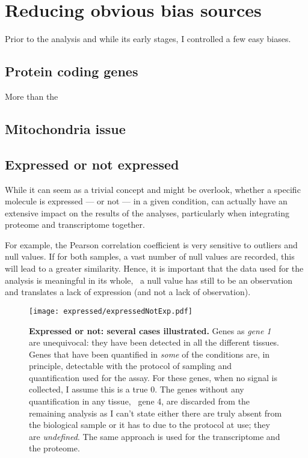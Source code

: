\section{Reducing obvious bias sources}

Prior to the analysis and while its early stages,
I controlled a few easy biases.

\subsection{Protein coding genes}
More than the 

\subsection{Mitochondria issue}\label{subsec:mito}

\subsection{Expressed or not expressed}
\label{sec:ExpressedOrNot}

While it can seem as a trivial concept and might be overlook, whether a specific
molecule is expressed --- or not --- in a given condition, can actually have
an extensive impact on the results of the analyses, particularly when integrating
proteome and transcriptome together.

For example, the Pearson correlation coefficient is very
sensitive to outliers and null values. If for both samples, a vast number of
null values are recorded, this will lead to a greater similarity.
Hence, it is important that the data used for the analysis is meaningful in
its whole, \ie\ a null value has still to be an observation and translates
a lack of expression (and not a lack of observation).

\begin{figure}[!htbp]
    \texttt{[image: expressed/expressedNotExp.pdf]}\centering
      \caption[Expressed or not: several cases illustrated]
      {\label{fig:DefineExpression}\textbf{Expressed or not: several cases
      illustrated.}\smallbreak{} Genes as \emph{gene 1} are unequivocal: they have been
      detected in all the different tissues. Genes that have been quantified in
      \emph{some} of the conditions are, in principle, detectable with the
      protocol of sampling and quantification used for the assay.
      For these genes, when no signal is collected, I assume this is a true $0$.
      The genes without any quantification
      in any tissue, \eg\ gene 4, are discarded from the remaining analysis as
      I can't state
      either there are truly absent from the biological sample or it has to due
      to the protocol at use; they are \emph{undefined}. The same approach is used
      for the transcriptome and the proteome.}
\end{figure}

